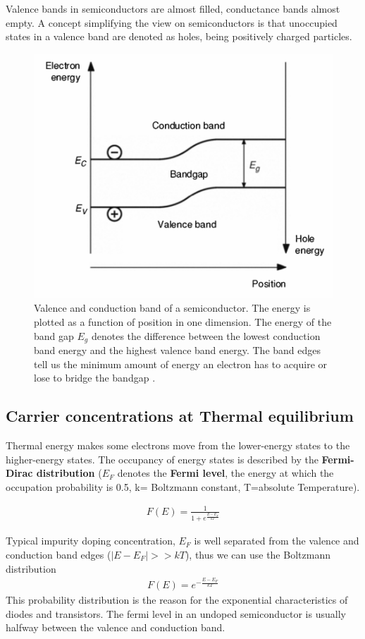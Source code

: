 \documentclass[main]{subfiles}
\begin{document}
Valence bands in semiconductors are almost filled, conductance bands almost empty. A concept simplifying the view on semiconductors is that unoccupied states in a valence band are denoted as holes, being positively charged particles.

\begin{figure}[H]
\centering
\includegraphics[scale=0.5]{figs/bandgap.png}
\caption{Valence and conduction band of a semiconductor. The energy is plotted as a function of position in one dimension. The energy of the band gap \(E_g\) denotes the difference between the lowest conduction band energy and the highest valence band energy. The band edges tell us the minimum amount of energy an electron has to acquire or lose to bridge the bandgap \cite{book:VLSI}.}
\end{figure}

\subsection{Carrier concentrations at Thermal equilibrium}
Thermal energy makes some electrons move from the lower-energy states to the higher-energy states. The occupancy of energy states is described by the \textbf{Fermi-Dirac distribution} (\(E_F\) denotes the \textbf{Fermi level}, the energy at which the occupation probability is 0.5, k= Boltzmann constant, T=absolute Temperature).

\begin{align*}
F(E) = \frac{1}{1+e^{\frac{E-E_F}{kT}}}
\end{align*}

Typical impurity doping concentration, \(E_F\) is well separated from the valence and conduction band edges (\(|E-E_F| >> kT\)), thus we can use the Boltzmann distribution
\begin{align*}
F(E) = e^{-\frac{E-E_F}{kT}}
\end{align*}
This probability distribution is the reason for the exponential characteristics of diodes and transistors. The fermi level in an undoped semiconductor is usually halfway between the valence and conduction band.
\end{document}
